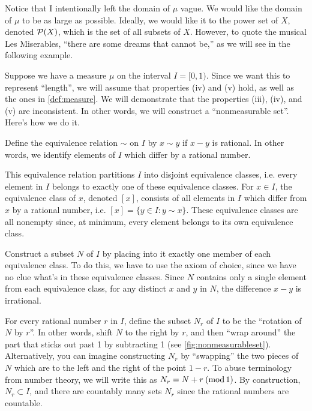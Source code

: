 \documentclass[main.tex]{subfiles}
\begin{document}
Notice that I intentionally left the domain of $\mu$ vague. We would like the domain of $\mu$ to be as large as possible. Ideally, we would like it to the power set of $X$, denoted ${\mathcal P}(X)$, which is the set of all subsets of $X$. However, to quote the musical Les Miserables, ``there are some dreams that cannot be,'' as we will see in the following example.

\begin{example}\label{ex:nonmeasurableset}
Suppose we have a measure $\mu$ on the interval $I = [0, 1)$. Since we want this to represent ``length'', we will assume that properties (iv) and (v) hold, as well as the ones in \cref{def:measure}. We will demonstrate that the properties (iii), (iv), and (v) are inconsistent. In other words, we will construct a ``nonmeasurable set''. Here's how we do it.
\begin{remunerate}
	\item Define the equivalence relation $\sim$ on $I$ by $x \sim y$ if $x - y$ is rational. In other words, we identify elements of $I$ which differ by a rational number. 
	\item This equivalence relation partitions $I$ into disjoint equivalence classes, i.e. every element in $I$ belongs to exactly one of these equivalence classes. For $x \in I$, the equivalence class of $x$, denoted $[x]$, consists of all elements in $I$ which differ from $x$ by a rational number, i.e. $[x] = \{ y \in I : y \sim x \}$. These equivalence classes are all nonempty since, at minimum, every element belongs to its own equivalence class. 
	\item Construct a subset $N$ of $I$ by placing into it exactly one member of each equivalence class. To do this, we have to use the axiom of choice, since we have no clue what's in these equivalence classes. Since $N$ contains only a single element from each equivalence class, for any distinct $x$ and $y$ in $N$, the difference $x-y$ is irrational.
	\item For every rational number $r$ in $I$, define the subset $N_r$ of $I$ to be the ``rotation of $N$ by $r$''. In other words, shift $N$ to the right by $r$, and then ``wrap around'' the part that sticks out past 1 by subtracting 1 (see \cref{fig:nonmeasurableset}). Alternatively, you can imagine constructing $N_r$ by ``swapping'' the two pieces of $N$ which are to the left and the right of the point $1-r$. To abuse terminology from number theory, we will write this as $N_r = N + r\:(\operatorname{mod} 1)$. By construction, $N_r \subset I$, and there are countably many sets $N_r$ since the rational numbers are countable.

\end{remunerate}
\end{example}
\end{document}
